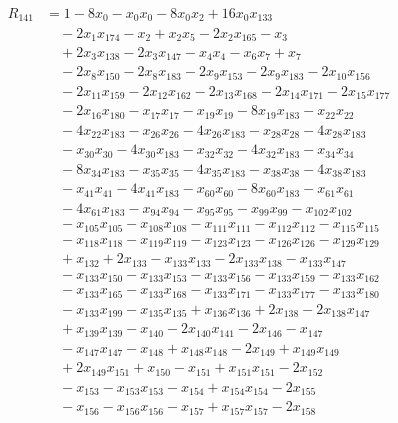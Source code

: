 \begin{align*}
R_{141}&={}1 -8x_{0} -x_{0}x_{0} -8x_{0}x_{2} +16x_{0}x_{133}\\
&\quad{}-2x_{1}x_{174} -x_{2} +x_{2}x_{5} -2x_{2}x_{165} -x_{3}\\
&\quad{}+2x_{3}x_{138} -2x_{3}x_{147} -x_{4}x_{4} -x_{6}x_{7} +x_{7}\\
&\quad{}-2x_{8}x_{150} -2x_{8}x_{183} -2x_{9}x_{153} -2x_{9}x_{183} -2x_{10}x_{156}\\
&\quad{}-2x_{11}x_{159} -2x_{12}x_{162} -2x_{13}x_{168} -2x_{14}x_{171} -2x_{15}x_{177}\\
&\quad{}-2x_{16}x_{180} -x_{17}x_{17} -x_{19}x_{19} -8x_{19}x_{183} -x_{22}x_{22}\\
&\quad{}-4x_{22}x_{183} -x_{26}x_{26} -4x_{26}x_{183} -x_{28}x_{28} -4x_{28}x_{183}\\
&\quad{}-x_{30}x_{30} -4x_{30}x_{183} -x_{32}x_{32} -4x_{32}x_{183} -x_{34}x_{34}\\
&\quad{}-8x_{34}x_{183} -x_{35}x_{35} -4x_{35}x_{183} -x_{38}x_{38} -4x_{38}x_{183}\\
&\quad{}-x_{41}x_{41} -4x_{41}x_{183} -x_{60}x_{60} -8x_{60}x_{183} -x_{61}x_{61}\\
&\quad{}-4x_{61}x_{183} -x_{94}x_{94} -x_{95}x_{95} -x_{99}x_{99} -x_{102}x_{102}\\
&\quad{}-x_{105}x_{105} -x_{108}x_{108} -x_{111}x_{111} -x_{112}x_{112} -x_{115}x_{115}\\
&\quad{}-x_{118}x_{118} -x_{119}x_{119} -x_{123}x_{123} -x_{126}x_{126} -x_{129}x_{129}\\
&\quad{}+x_{132} +2x_{133} -x_{133}x_{133} -2x_{133}x_{138} -x_{133}x_{147}\\
&\quad{}-x_{133}x_{150} -x_{133}x_{153} -x_{133}x_{156} -x_{133}x_{159} -x_{133}x_{162}\\
&\quad{}-x_{133}x_{165} -x_{133}x_{168} -x_{133}x_{171} -x_{133}x_{177} -x_{133}x_{180}\\
&\quad{}-x_{133}x_{199} -x_{135}x_{135} +x_{136}x_{136} +2x_{138} -2x_{138}x_{147}\\
&\quad{}+x_{139}x_{139} -x_{140} -2x_{140}x_{141} -2x_{146} -x_{147}\\
&\quad{}-x_{147}x_{147} -x_{148} +x_{148}x_{148} -2x_{149} +x_{149}x_{149}\\
&\quad{}+2x_{149}x_{151} +x_{150} -x_{151} +x_{151}x_{151} -2x_{152}\\
&\quad{}-x_{153} -x_{153}x_{153} -x_{154} +x_{154}x_{154} -2x_{155}\\
&\quad{}-x_{156} -x_{156}x_{156} -x_{157} +x_{157}x_{157} -2x_{158}\\

\end{align*}
